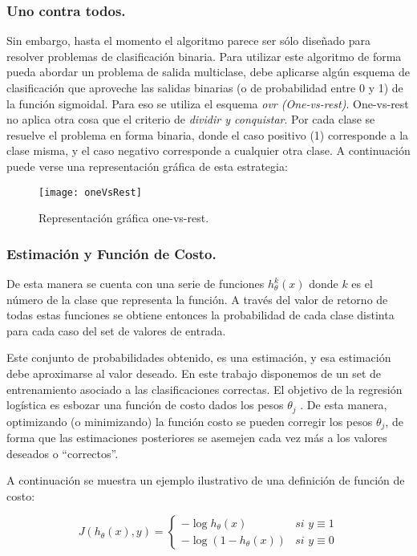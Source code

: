 \subsubsection{Uno contra todos.}
Sin embargo, hasta el momento el algoritmo parece ser sólo diseñado para resolver problemas de clasificación binaria. Para utilizar este algoritmo de forma pueda abordar un problema de salida multiclase, debe aplicarse algún esquema de clasificación que aproveche las salidas binarias (o de probabilidad entre 0 y 1) de la función sigmoidal. Para eso se utiliza el esquema \textit{ovr (One-vs-rest)}. One-vs-rest no aplica otra cosa que el criterio de \textit{dividir y conquistar}. Por cada clase se resuelve el problema en forma binaria, donde el caso positivo (1) corresponde a la clase misma, y el caso negativo corresponde a cualquier otra clase. A continuación puede verse una representación gráfica de esta estrategia:

\begin{figure}[H]
\centering
\texttt{[image: oneVsRest]}
\caption{Representación gráfica one-vs-rest. \cite{AndrewNgMulticlass}}
\label{fig:oneVsRest}
\end{figure}

\subsubsection{Estimación y Función de Costo.}
De esta manera se cuenta con una serie de funciones $h_{\theta}^k(x)$ donde $k$ es el número de la clase que representa la función. A través del valor de retorno de todas estas funciones se obtiene entonces la probabilidad de cada clase distinta para cada caso del set de valores de entrada.

Este conjunto de probabilidades obtenido, es una estimación, y esa estimación debe aproximarse al valor deseado. En este trabajo disponemos de un set de entrenamiento asociado a las clasificaciones correctas. El objetivo de la regresión logística es esbozar una función de costo dados los pesos $\theta_{j}$ . De esta manera, optimizando (o minimizando) la función costo se pueden corregir los pesos $\theta_{j}$, de forma que las estimaciones posteriores se asemejen cada vez más a los valores deseados o ``correctos''.

A continuación se muestra un ejemplo ilustrativo de una definición de función de costo:

\begin{equation}
J(h_{\theta }(x),y) = \begin{cases}
- \log h_{\theta}(x) & \textit{si $y \equiv 1$} \\
- \log (1- h_{\theta}(x)) & \textit{si $y \equiv 0$}
\end{cases}
\end{equation}

